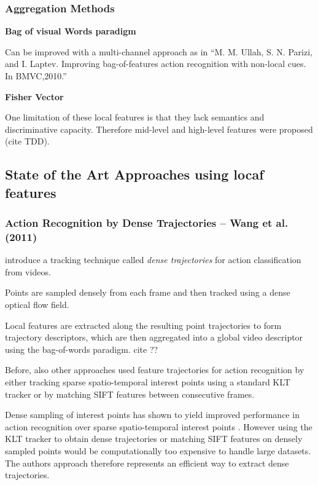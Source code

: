 \subsubsection{Aggregation Methods}

\textbf{Bag of visual Words paradigm}

Can be improved with a multi-channel approach as in ``M. M. Ullah, S. N. Parizi, and I. Laptev. Improving bag-of-features action recognition with non-local cues. In BMVC,2010.''

\textbf{Fisher Vector}

One limitation of these local features is that they lack semantics and discriminative capacity. Therefore mid-level and high-level features were proposed (cite TDD).

\subsection{State of the Art Approaches using locaf features}

\subsubsection{Action Recognition by Dense Trajectories -- Wang et al. (2011)}

\textcite{wang_action_2011} introduce a tracking technique called \textit{dense trajectories} for action classification from videos.

Points are sampled densely from each frame and then tracked using a dense optical flow field.

Local features are extracted along the resulting point trajectories to form trajectory descriptors, which are then aggregated into a global video descriptor using the bag-of-words paradigm. cite ??

Before, also other approaches used feature trajectories for action recognition by either tracking sparse spatio-temporal interest points using a standard KLT tracker or by matching SIFT features between consecutive frames.

Dense sampling of interest points has shown to yield improved performance in action recognition over sparse spatio-temporal interest points \cite{wang_evaluation_2009}.
However using the KLT tracker to obtain dense trajectories or matching SIFT features on densely sampled points would be computationally too expensive to handle large datasets. 
The authors approach therefore represents an efficient way to extract dense trajectories.

